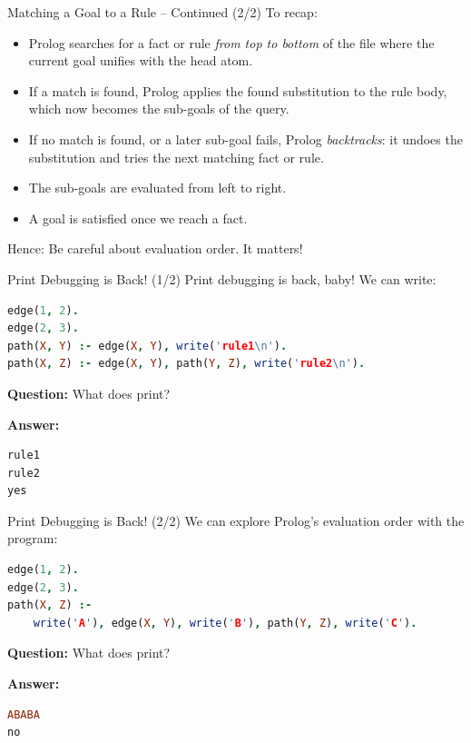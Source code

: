 \begin{frame}[fragile]{Matching a Goal to a Rule -- Continued (2/2)}
To recap:

\begin{itemize}
    \pause \item Prolog searches for a fact or rule \emph{from top to bottom} of the
    file where the current goal unifies with the head atom.
    \pause \item If a match is found, Prolog applies the found substitution to the rule
    body, which now becomes the sub-goals of the query. 
    \pause \item If no match is found, or a later sub-goal fails, Prolog
    \emph{backtracks}: it undoes the substitution and tries the next matching
    fact or rule.
    \pause \item The sub-goals are evaluated from left to right.
    \pause \item A goal is satisfied once we reach a fact.
\end{itemize}

\pause Hence: Be careful about evaluation order. It matters!
\end{frame}

\begin{frame}[fragile]{Print Debugging is Back! (1/2)}
Print debugging is back, baby! We can write:

\begin{lstlisting}[language=prolog, xleftmargin=0.5cm]
edge(1, 2).
edge(2, 3).
path(X, Y) :- edge(X, Y), write('rule1\n').
path(X, Z) :- edge(X, Y), path(Y, Z), write('rule2\n').
\end{lstlisting}

\textbf{Question:} What does  print?

\pause \textbf{Answer:}

\begin{lstlisting}[language=prolog, xleftmargin=0.5cm]
rule1
rule2
yes
\end{lstlisting}
\end{frame}

\begin{frame}[fragile]{Print Debugging is Back! (2/2)}
We can explore Prolog's evaluation order with the program:

\begin{lstlisting}[language=prolog, xleftmargin=0.5cm]
edge(1, 2).
edge(2, 3).
path(X, Z) :-
    write('A'), edge(X, Y), write('B'), path(Y, Z), write('C').
\end{lstlisting}

\textbf{Question:} What does  print?

\pause \textbf{Answer:}

\begin{lstlisting}[language=prolog, xleftmargin=0.5cm]
ABABA
no
\end{lstlisting}
\end{frame}

